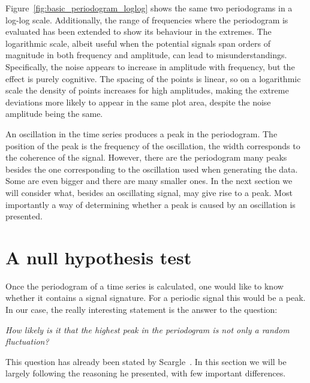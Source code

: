 Figure~\ref{fig:basic_periodogram_loglog} shows the same two periodograms in a log-log scale. Additionally, the range of frequencies where the periodogram is evaluated has been extended to show its behaviour in the extremes. The logarithmic scale, albeit useful when the potential signals span orders of magnitude in both frequency and amplitude, can lead to misunderstandings. Specifically, the noise appears to increase in amplitude with frequency, but the effect is purely cognitive. The spacing of the points is linear, so on a logarithmic scale the density of points increases for high amplitudes, making the extreme deviations more likely to appear in the same plot area, despite the noise amplitude being the same.

An oscillation in the time series produces a peak in the periodogram. The position of the peak is the frequency of the oscillation, the width corresponds to the coherence of the signal. However, there are the periodogram many peaks besides the one corresponding to the oscillation used when generating the data. Some are even bigger and there are many smaller ones. In the next section we will consider what, besides an oscillating signal, may give rise to a peak. Most importantly a way of determining whether a peak is caused by an oscillation is presented.




\section{A null hypothesis test}
Once the periodogram of a time series is calculated, one would like to know whether it contains a signal signature. For a periodic signal this would be a peak. In our case, the really interesting statement is the answer to the question:

\begin{center}
  \emph{How likely is it that the highest peak in the periodogram is not only a random fluctuation?}
\end{center}


This question has already been stated by Scargle~\cite{Scargle1982}. In this section we will be largely following the reasoning he presented, with few important differences.

